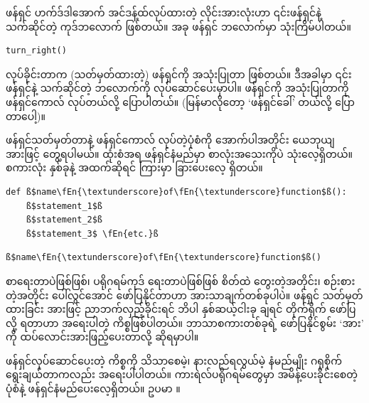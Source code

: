 ဖန်ရှင် ဟက်ဒ်ဒါအောက် အင်ဒန့်ထ်လုပ်ထားတဲ့ လိုင်းအားလုံးဟာ ၎င်းဖန်ရှင်နဲ့ သက်ဆိုင်တဲ့ ကုဒ်ဘလောက် ဖြစ်တယ်။ အခု  ဖန်ရှင် ဘလောက်မှာ  သုံးကြိမ်ပါတယ်။ 
%
\setlength{\fboxsep}{0pt}
\begin{verbatim}
turn_right()
\end{verbatim}
%
လုပ်ခိုင်းတာက (သတ်မှတ်ထားတဲ့) ဖန်ရှင်ကို အသုံးပြုတာ ဖြစ်တယ်။ ဒီအခါမှာ ၎င်းဖန်ရှင်နဲ့ သက်ဆိုင်တဲ့ ဘလောက်ကို လုပ်ဆောင်ပေးမှာပါ။ ဖန်ရှင်ကို အသုံးပြုတာကို ဖန်ရှင်ကောလ်  လုပ်တယ်လို့ ပြောပါတယ်။ (မြန်မာလိုတော့ ‘ဖန်ရှင်ခေါ်’ တယ်လို့ ပြောတာပေါ့)။

ဖန်ရှင်သတ်မှတ်တာနဲ့ ဖန်ရှင်ကောလ် လုပ်တဲ့ပုံစံကို အောက်ပါအတိုင်း ယေဘုယျအားဖြင့် တွေ့ရပါမယ်။  ထုံးစံအရ ဖန်ရှင်နံမည်မှာ စာလုံးအသေးကိုပဲ သုံးလေ့ရှိတယ်။ စကားလုံး နှစ်ခုနဲ့ အထက်ဆိုရင် ကြားမှာ  ခြားပေးလေ့ ရှိတယ်။ 
%
\setlength{\fboxsep}{0pt}
\begin{verbatim}
def ß$name\fEn{\textunderscore}of\fEn{\textunderscore}function$ß():
    ß$statement_1$ß
    ß$statement_2$ß
    ß$statement_3$ \fEn{etc.}ß
\end{verbatim}
%
\betweenminted{\medskipamount}
%
\setlength{\fboxsep}{0pt}
\begin{verbatim}
ß$name\fEn{\textunderscore}of\fEn{\textunderscore}function$ß()
\end{verbatim}
%

\begin{mytcboxflt}
\noindent {}
\betweentcboxpar
\noindent စာရေးတာပဲဖြစ်ဖြစ်၊ ပရိုဂရမ်ကုဒ် ရေးတာပဲဖြစ်ဖြစ် စိတ်ထဲ တွေးတဲ့အတိုင်း၊ စဉ်းစားတဲ့အတိုင်း ပေါ်လွင်အောင် ဖော်ပြနိုင်တာဟာ အားသာချက်တစ်ခုပါပဲ။ ဖန်ရှင် သတ်မှတ်ထားခြင်း အားဖြင့် ညာဘက်လှည့်ခိုင်းရင်  ဘိပါ နှစ်ဆယ့်ငါးခု ချရင်   တိုက်ရိုက် ဖော်ပြလို့ ရတာဟာ အရေးပါတဲ့ ကိစ္စဖြစ်ပါတယ်။ ဘာသာစကားတစ်ခုရဲ့ ဖော်ပြနိုင်စွမ်း ‘အား’  ကို ထပ်လောင်းအားဖြည့်ပေးတာလို့ ဆိုရမှာပါ။
\betweentcboxpar

ဖန်ရှင်လုပ်ဆောင်ပေးတဲ့ ကိစ္စကို သိသာစေမဲ့၊ နားလည်ရလွယ်မဲ့ နံမည်မျိုး ဂရုစိုက်ရွေးချယ်တာကလည်း အရေးပါပါတယ်။ ကားရဲလ်ပရိုဂရမ်တွေမှာ အမိန့်ပေးခိုင်းစေတဲ့ ပုံစံနဲ့ ဖန်ရှင်နံမည်ပေးလေ့ရှိတယ်။ ဥပမာ \fEn{,}  ။    
\end{mytcboxflt}

